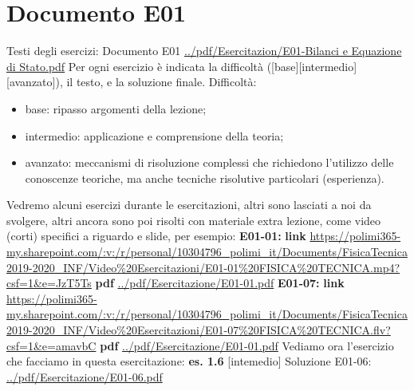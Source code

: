 \section*{Documento E01}
Testi degli esercizi:\newline
Documento E01 \url{../pdf/Esercitazion/E01-Bilanci e Equazione di Stato.pdf}\newline
\newline
Per ogni esercizio è indicata la difficoltà ([base][intermedio][avanzato]), il testo, e la soluzione finale.\newline
Difficoltà:
\begin{itemize}
    \item base: ripasso argomenti della lezione;
    \item intermedio: applicazione e comprensione della teoria;
    \item avanzato: meccanismi di risoluzione complessi che richiedono l'utilizzo delle conoscenze teoriche, ma anche tecniche risolutive particolari (esperienza).
\end{itemize}
Vedremo alcuni esercizi durante le esercitazioni, altri sono lasciati a noi da svolgere, altri ancora sono poi risolti con materiale extra lezione, come video (corti) specifici a riguardo e slide, per esempio:\newline
\newline
\textbf{E01-01:}\newline 
\textbf{link} \url{https://polimi365-my.sharepoint.com/:v:/r/personal/10304796_polimi_it/Documents/FisicaTecnica2019-2020_INF/Video%20Esercitazioni/E01-01%20FISICA%20TECNICA.mp4?csf=1&e=JzT5Ts}\newline
\textbf{pdf} \url{../pdf/Esercitazione/E01-01.pdf}\newline
\newline
\textbf{E01-07:}\newline 
\textbf{link} \url{https://polimi365-my.sharepoint.com/:v:/r/personal/10304796_polimi_it/Documents/FisicaTecnica2019-2020_INF/Video%20Esercitazioni/E01-07%20FISICA%20TECNICA.flv?csf=1&e=amavbC}\newline
\textbf{pdf} \url{../pdf/Esercitazione/E01-01.pdf}\newline
\newline
\newline
Vediamo ora l'esercizio che facciamo in questa esercitazione:\newline
\newline
\textbf{es. 1.6} [intemedio]\newline
Soluzione E01-06: \url{../pdf/Esercitazione/E01-06.pdf}